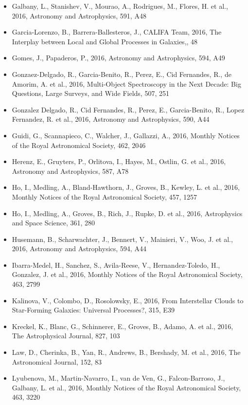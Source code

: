 \documentclass{letter}
\begin{document}
\begin{enumerate}
\begin{itemize}
\item Galbany, L., Stanishev, V., Mourao, A., Rodrigues, M., Flores, H. et al., 2016, Astronomy and Astrophysics, 591, A48
\item Garcia-Lorenzo, B., Barrera-Ballesteros, J., CALIFA Team, 2016, The Interplay between Local and Global Processes in Galaxies,, 48
\item Gomes, J., Papaderos, P., 2016, Astronomy and Astrophysics, 594, A49
\item Gonzaez-Delgado, R., Garcia-Benito, R., Perez, E., Cid Fernandes, R., de Amorim, A. et al., 2016, Multi-Object Spectroscopy in the Next Decade: Big Questions, Large Surveys, and Wide Fields, 507, 251
\item Gonzalez Delgado, R., Cid Fernandes, R., Perez, E., Garcia-Benito, R., Lopez Fernandez, R. et al., 2016, Astronomy and Astrophysics, 590, A44
\item Guidi, G., Scannapieco, C., Walcher, J., Gallazzi, A., 2016, Monthly Notices of the Royal Astronomical Society, 462, 2046
\item Herenz, E., Gruyters, P., Orlitova, I., Hayes, M., Ostlin, G. et al., 2016, Astronomy and Astrophysics, 587, A78
\item Ho, I., Medling, A., Bland-Hawthorn, J., Groves, B., Kewley, L. et al., 2016, Monthly Notices of the Royal Astronomical Society, 457, 1257
\item Ho, I., Medling, A., Groves, B., Rich, J., Rupke, D. et al., 2016, Astrophysics and Space Science, 361, 280
\item Husemann, B., Scharwachter, J., Bennert, V., Mainieri, V., Woo, J. et al., 2016, Astronomy and Astrophysics, 594, A44
\item Ibarra-Medel, H., Sanchez, S., Avila-Reese, V., Hernandez-Toledo, H., Gonzalez, J. et al., 2016, Monthly Notices of the Royal Astronomical Society, 463, 2799
\item Kalinova, V., Colombo, D., Rosolowsky, E., 2016, From Interstellar Clouds to Star-Forming Galaxies: Universal Processes?, 315, E39
\item Kreckel, K., Blanc, G., Schinnerer, E., Groves, B., Adamo, A. et al., 2016, The Astrophysical Journal, 827, 103
\item Law, D., Cherinka, B., Yan, R., Andrews, B., Bershady, M. et al., 2016, The Astronomical Journal, 152, 83
\item Lyubenova, M., Martin-Navarro, I., van de Ven, G., Falcon-Barroso, J., Galbany, L. et al., 2016, Monthly Notices of the Royal Astronomical Society, 463, 3220

\end{itemize}
\end{enumerate}
\end{document}
